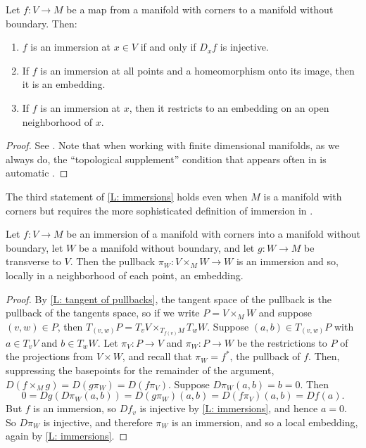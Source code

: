 \begin{lemma}\label{L: immersions}
	Let $f \colon V \to M$ be a map from a manifold with corners to a manifold without boundary.
	Then:
	\begin{enumerate}
		\item $f$ is an immersion at $x \in V$ if and only if $D_xf$ is injective.
		\item If $f$ is an immersion at all points and a homeomorphism onto its image, then it is an embedding.
		\item If $f$ is an immersion at $x$, then it restricts to an embedding on an open neighborhood of $x$.
	\end{enumerate}
\end{lemma}
\begin{proof}
	See \cite[Theorem 3.2.6, Proposition 3.2.13, and Definition 3.3.1]{MaDo92}. 
	Note that when working with finite dimensional manifolds, as we always do, the ``topological supplement'' condition that appears often in \cite{MaDo92} is automatic \cite[page 7]{MaDo92}.
\end{proof}

The third statement of \cref{L: immersions} holds even when $M$ is a manifold with corners but requires the more sophisticated definition of immersion in \cite{MaDo92}.


\begin{lemma}\label{L: immersion pullback}
	Let $f \colon V \to M$ be an immersion of a manifold with corners into a manifold without boundary, let $W$ be a manifold without boundary, and let $g \colon W \to M$ be transverse to $V$. 
	Then the pullback $\pi_W: V \times_M W \to W$ is an immersion and so, locally in a neighborhood of each point, an embedding.
\end{lemma}
\begin{proof}
	By \cref{L: tangent of pullbacks}, the tangent space of the pullback is the pullback of the tangents space, so if we write $P = V \times_M W$ and suppose $(v,w) \in P$, then $T_{(v,w)}P = T_vV \times_{T_{f(v)}M} T_wW$. 
	Suppose $(a,b) \in T_{(v,w)}P$ with $a \in T_vV$ and $b \in T_wW$. 
	Let $\pi_V \colon P \to V$ and $\pi_W \colon P \to W$ be the restrictions to $P$ of the projections from $V \times W$, and recall that $\pi_W = f^*$, the pullback of $f$.
	Then, suppressing the basepoints for the remainder of the argument, $D(f \times_M g) = D(g\pi_W) = D(f \pi_V)$.
	Suppose $D\pi_W(a,b)= b = 0$. 
	Then $$0 = Dg(D\pi_W(a,b))= D(g\pi_W)(a,b) = D(f \pi_V)(a,b) = Df(a).$$
	But $f$ is an immersion, so $Df_v$ is injective by \cref{L: immersions}, and hence $a=0$. 
	So $D\pi_W$ is injective, and therefore $\pi_W$ is an immersion, and so a local embedding, again by \cref{L: immersions}. 
\end{proof}


